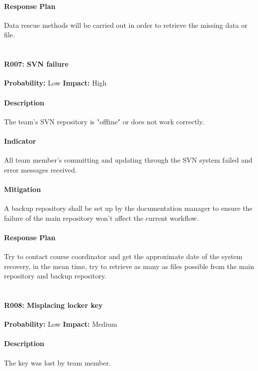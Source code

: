 \documentclass[11pt, a4paper]{report}
\begin{document}
	\paragraph{Response Plan}Data rescue methods will be carried out in order to retrieve the missing data or file.\\\\

	\paragraph{R007: SVN failure} \hspace{1cm} \textbf{Probability: }Low\hspace{1cm}   \textbf{Impact: }High
	\paragraph{Description}The team's SVN repository is "offline" or does not work correctly.
	\paragraph{Indicator}All team member's committing and updating through the SVN system failed and error messages received.
	\paragraph{Mitigation}A backup repository shall be set up by the documentation manager to ensure the failure of the main repository won't affect the current workflow.
	\paragraph{Response Plan}Try to contact course coordinator and get the approximate date of the system recovery, in the mean time, try to retrieve as many as files possible from the main repository and backup repository.\\\\

\pagebreak

	\paragraph{R008: Misplacing locker key} \hspace{1cm} \textbf{Probability: }Low\hspace{1cm}   \textbf{Impact: }Medium
	\paragraph{Description}The key was lost by team member. 
\end{document}
